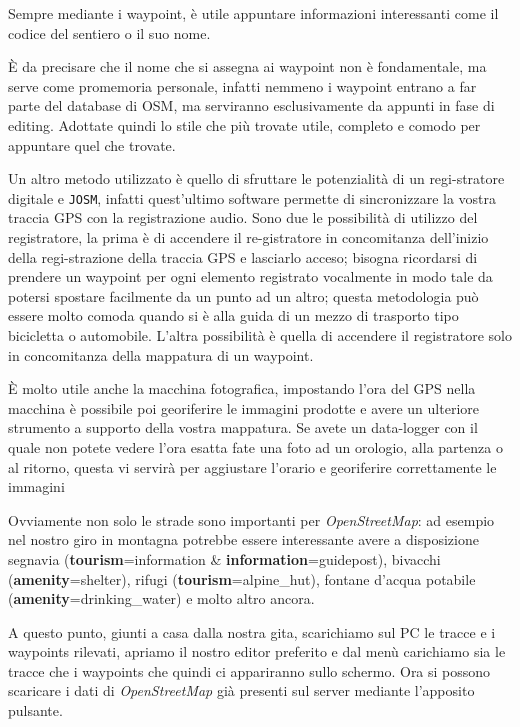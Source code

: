 \documentclass[a4paper,twoside,12pt,]{article}
\newcommand{\osm}{\emph{OpenStreetMap}\xspace}
\newcommand{\gps}{GPS\xspace}
\newcommand{\key}[1]{\textsf{\textbf{#1}}}
\newcommand{\val}[1]{\textsf{#1}}
\newcommand{\soft}[1]{\texttt{#1}}
\begin{document}
Sempre mediante i waypoint, è utile appuntare informazioni interessanti come il codice del sentiero o il suo nome.

È da precisare che il nome che si assegna ai waypoint non è fondamentale, ma serve come promemoria personale, infatti nemmeno i waypoint entrano a far parte del database di OSM, ma serviranno esclusivamente da appunti in fase di editing. Adottate quindi lo stile che più trovate utile, completo e comodo per appuntare quel che trovate.

Un altro metodo utilizzato è quello di sfruttare le potenzialità di un regi-stratore digitale e \soft{JOSM}, infatti quest'ultimo software permette di sincronizzare la vostra traccia \gps con la registrazione audio. Sono due le possibilità di utilizzo del registratore, la prima è di accendere il re-gistratore in concomitanza dell'inizio della regi-strazione della traccia \gps e lasciarlo acceso; bisogna ricordarsi di prendere un waypoint per ogni elemento registrato vocalmente in modo tale da potersi spostare facilmente da un punto ad un altro; questa metodologia può essere molto comoda quando si è alla guida di un mezzo di trasporto tipo bicicletta o automobile. L'altra possibilità è quella di accendere il registratore solo in concomitanza della mappatura di un waypoint.

È molto utile anche la macchina fotografica, impostando l'ora del GPS nella macchina è possibile poi georiferire le immagini prodotte e avere un ulteriore strumento a supporto della vostra mappatura. Se avete un data-logger con il quale non potete vedere l'ora esatta fate una foto ad un orologio, alla partenza o al ritorno, questa vi servirà per aggiustare l'orario e georiferire correttamente le immagini

Ovviamente non solo le strade sono importanti per \osm: ad esempio nel nostro giro in montagna potrebbe essere interessante avere a disposizione segnavia (\key{tourism}=\val{information} \& \key{information}=\val{guidepost}), bivacchi (\key{amenity}=\val{shelter}), rifugi (\key{tourism}=\val{alpine\_hut}), fontane d'acqua potabile (\key{amenity}=\val{drinking\_water}) e molto altro ancora.

A questo punto, giunti a casa dalla nostra gita, scarichiamo sul PC le tracce e i waypoints rilevati, apriamo il nostro editor preferito e dal menù carichiamo sia le tracce che i waypoints che quindi ci appariranno sullo schermo. Ora si possono scaricare i dati di \osm già presenti sul server mediante l'apposito pulsante.
\end{document}
